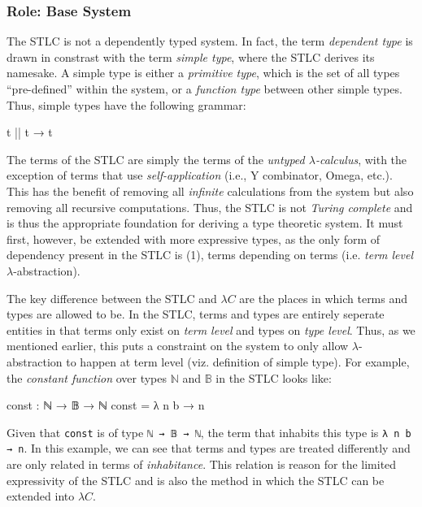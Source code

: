 \documentclass[12pt]{article}
\begin{document}
\subsubsection*{Role: Base System}
The STLC is not a dependently typed system. In fact, the term {\em dependent type}
is drawn in constrast with the term {\em simple type}, where the STLC derives
its namesake. A simple type is either a {\em primitive type}, which is the set
of all types ``pre-defined'' within the system, or a {\em function type} between
other simple types. Thus, simple types have the following grammar:
\begin{center}
\begin{minipage}{0.5\textwidth}
\begin{code}
t || t → t
\end{code}
\end{minipage}
\end{center}
The terms of the STLC are simply the terms of the \textit{untyped \(\lambda\)-calculus},
with the exception of terms that use \textit{self-application} (i.e., Y
combinator, Omega, etc.). This has the benefit of removing all \textit{infinite}
calculations from the system but also removing all recursive computations. Thus,
the STLC is not \textit{Turing complete} and is thus the appropriate foundation
for deriving a type theoretic system. It must first, however, be extended with
more expressive types, as the only form of dependency present in the STLC is (1),
terms depending on terms (i.e. {\em term level} \(\lambda\)-abstraction).

The key difference between the STLC and \(\lambda C\) are the places in which
terms and types are allowed to be. In the STLC, terms and types are entirely
seperate entities in that terms only exist on {\em term level} and types
on {\em type level}. Thus, as we mentioned earlier, this puts a constraint
on the system to only allow \(\lambda\)-abstraction to happen at term level
(viz. definition of simple type). For example, the \textit{constant function}
over types \(\mathbb{N}\) and \(\mathbb{B}\) in the STLC looks like:
\begin{center}
\begin{minipage}{0.5\textwidth}
\begin{code}
const : ℕ → 𝔹 → ℕ
const = λ n b → n
\end{code}
\end{minipage}
\end{center}
Given that {\tt const} is of type {\tt ℕ → 𝔹 → ℕ}, the term that inhabits this
type is {\tt λ n b → n}. In this example, we can see that terms and types are
treated differently and are only related in terms of {\em inhabitance}. This
relation is reason for the limited expressivity of the STLC and is also the
method in which the STLC can be extended into \(\lambda C\).
\end{document}
